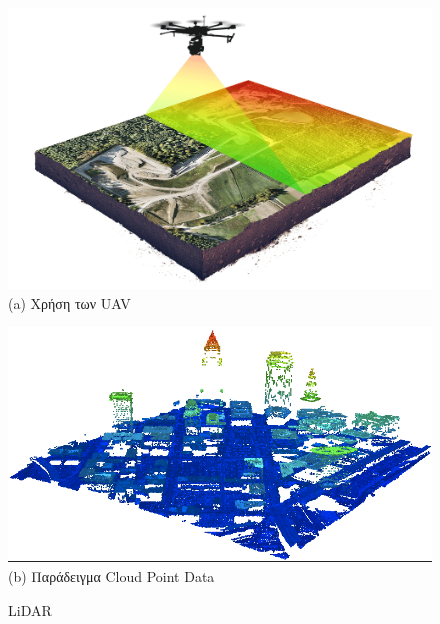 \begin{figure} [H]
	\centering
		\begin{minipage}{.47\textwidth}
			\centering
			\includegraphics[width=\linewidth]{Images/Related-Work/lidar-drone-example.png}\\
			{(a) Χρήση των UAV }
		\end{minipage}%
		\hspace*{+0.8cm}
		\begin{minipage}{.47\textwidth}
			\centering
			\includegraphics[width=\linewidth]{Images/Related-Work/lidar-cloud.png}\\
			{(b) Παράδειγμα Cloud Point Data }
		\end{minipage}
    \hfill \break
    \decoRule
	\caption[LiDAR]{LiDAR}
    \label{fig:drone-lidar}
\end{figure}

